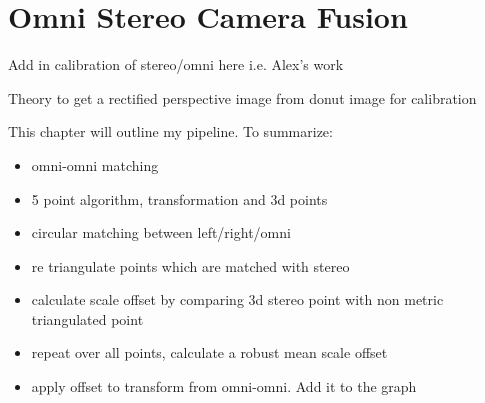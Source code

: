 \chapter{Omni Stereo Camera Fusion}
\label{chapter:omni_stereo_fusion}

Add in calibration of stereo/omni here i.e. Alex's work

Theory to get a rectified perspective image from donut image for calibration

This chapter will outline my pipeline.  To summarize:

\begin{itemize}
\itemsep0em
 \item omni-omni matching
 \item 5 point algorithm, transformation and 3d points
 \item circular matching between left/right/omni
 \item re triangulate points which are matched with stereo
 \item calculate scale offset by comparing 3d stereo point with non metric triangulated point
 \item repeat over all points, calculate a robust mean scale offset
 \item apply offset to transform from omni-omni. Add it to the graph
\end{itemize}


